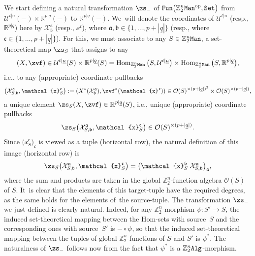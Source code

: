\documentclass[10pt,a4paper]{amsart}
\newcommand{\op}[1]{\operatorname{#1}}
\newcommand{\R}{{\mathbb R}}
\newcommand{\Z}{{\mathbb Z}}
\def\ul{\underline}
\def\cO{\mathcal{O}}
\def\ul{\underline}
\newcommand{\0}{\otimes}
\newcommand{\z}{\Z_2^n}
\numberwithin{equation}{section}
\begin{document}
We start defining a natural transformation $\zs_-$ of ${\tt Fun}\big(\z{\tt Man}^{\op{op}},{\tt Set}\big)$ from $\mathcal{U}^{t|\ul u}(-)\times\R^{p|\ul q}(-)$ to $\R^{p|\ul q}(-)$. We~will denote the coordinates of $\mathcal{U}^{t|\ul u}$ (resp., $\R^{p|\ul q}$) here by $\mathcal{X}^{\mathfrak{a}}_\mathfrak{b}$ (resp., $\mathcal{x}^{\mathfrak{c}}$), where $\mathfrak{a},\mathfrak{b}\in\{1,\dots,p+|\ul q|\}$ (resp., where $\mathfrak{c}\in\{1,\dots,p+|\ul q|\}$). For this, we must associate to any $S\in\z{\tt Man}$, a set-theoretical map $\zs_S$ that assigns to any
\[
(X,\zvf)\in\mathcal{U}^{t|\ul u}(S)\times\R^{p|\ul q}(S)=\op{Hom}_{\z{\tt Man}}\big(S,\mathcal{U}^{t|\ul u}\big)\times\op{Hom}_{\z{\tt Man}}\big(S,\R^{p|\ul q}\big),
\]
i.e., to any (appropriate) coordinate pullbacks
\begin{gather}\label{CoorPull}
\big(\mathcal{X}^\mathfrak{a}_{S,\mathfrak{b}},\mathcal{x}_S^{\mathfrak{c}}\big):= (X^*(\mathcal{X}^\mathfrak{a}_{\mathfrak{b}}),\zvf^*(\mathcal{x}^{\mathfrak{c}}))
\in\cO(S)^{\times (p+|\ul q|)^2}\times\cO(S)^{\times(p+|\ul q|)},
\end{gather}
a unique element $\zs_S(X,\zvf)\in\R^{p|\ul q}(S)$, i.e., unique (appropriate) coordinate pullbacks
\[
\zs_S\big(\mathcal{X}^\mathfrak{a}_{S,\mathfrak{b}},\mathcal{x}_S^{\mathfrak{c}}\big)\in\cO(S)^{\times(p+|\ul q|)}.
\]
Since $\big(\mathcal{x}_S^{\mathfrak{c}}\big)_{\mathfrak{c}}$ is viewed as a tuple (horizontal row), the natural definition of this image (horizontal row) is
\begin{gather}\label{NatTraCanAct}
\zs_S\big(\mathcal{X}^\mathfrak{a}_{S,\mathfrak{b}},\mathcal{x}_S^{\mathfrak{c}}\big) =\big(\mathcal{x}_S^{\mathfrak{b}}\;\mathcal{X}^{\mathfrak{a}}_{S,\mathfrak{b}}\big)_\mathfrak{a},
\end{gather}
where the sum and products are taken in the global $\z$-function algebra $\cO(S)$ of $S$. It~is clear that the elements of this target-tuple have the required degrees, as the same holds for the elements of~the source-tuple. The transformation $\zs_-$ we just defined is clearly natural. Indeed, for any $\z$-morphism $\psi\colon S'\to S$, the induced set-theoretical mapping between the Hom-sets with source~$S$ and the corresponding ones with source~$S'$ is $-\circ \psi$, so that the induced set-theoretical mapping between the tuples of global $\z$-functions of $S$ and $S'$ is $\psi^*$. The naturalness of $\zs_-$ follows now from the fact that $\psi^*$ is a $\z{\tt Alg}$-morphism.
\end{document}
